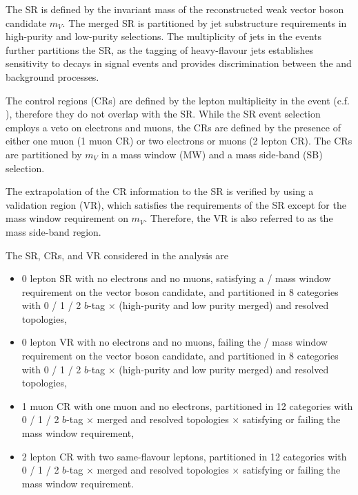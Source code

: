The SR is defined by the invariant mass of the reconstructed weak vector boson candidate \(m_{V}\). The merged SR is partitioned by jet substructure requirements in high-purity and low-purity selections. The multiplicity of \btagged jets in the events further partitions the SR, as the tagging of heavy-flavour jets establishes sensitivity to \HepProcess{\PZ \to \Pqb \Paqb} decays in signal events and provides discrimination between the \wjets and \ttbar background processes.

The control regions (CRs) are defined by the lepton multiplicity in the event (c.f. ), therefore they do not overlap with the SR. While the SR event selection employs a veto on electrons and muons, the CRs are defined by the presence of either one muon (1 muon CR) or two electrons or muons (2 lepton CR). The CRs are partitioned by \(m_{V}\) in a mass window (MW) and a mass side-band (SB) selection.

The extrapolation of the CR information to the SR is verified by using a validation region (VR), which satisfies the requirements of the SR except for the mass window requirement on \(m_{V}\). Therefore, the VR is also referred to as the mass side-band region.

The SR, CRs, and VR considered in the analysis are
\begin{itemize}
	\item 0 lepton SR with no electrons and no muons, satisfying a \PW / \PZ mass window requirement on the vector boson candidate, and partitioned in 8 categories with 0 / 1 / 2 \(b\)-tag \(\times\) (high-purity and low purity merged) and resolved topologies,
	\item 0 lepton VR with no electrons and no muons, failing the \PW / \PZ mass window requirement on the vector boson candidate, and partitioned in 8 categories with 0 / 1 / 2 \(b\)-tag \(\times\) (high-purity and low purity merged) and resolved topologies,
	\item 1 muon CR with one muon and no electrons, partitioned in 12 categories with 0 / 1 / 2 \(b\)-tag \(\times\) merged and resolved topologies \(\times\) satisfying or failing the mass window requirement,
	\item 2 lepton CR with two same-flavour leptons, partitioned in 12 categories with 0 / 1 / 2 \(b\)-tag \(\times\) merged and resolved topologies \(\times\) satisfying or failing the mass window requirement.
\end{itemize}

